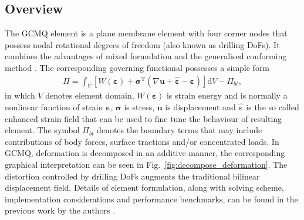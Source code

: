 \documentclass[3p,review,sort&compress,11pt,fleqn]{elsarticle}
\newcommand*{\md}[1]{\mathrm{d}#1}
\newcommand*{\mT}{\mathrm{T}}
\newcommand*{\figref}[1]{Fig.~\ref{#1}}
\newcommand*{\mathbold}{\bm}
\begin{document}
\subsection{Overview}
The GCMQ element is a plane membrane element with four corner nodes that possess nodal rotational degrees of freedom (also known as drilling DoFs). It combines the advantages of mixed formulation and the generalised conforming method \citep{Long2009}. The corresponding governing functional possesses a simple form
\begin{gather}\label{eq:final_principle}
\varPi=\int_V\left[W\left(\mathbold{\varepsilon}\right)+\mathbold{\sigma}^\mT\left(\nabla\mathbold{u}+\hat{\mathbold{\varepsilon}}-\mathbold{\varepsilon}\right)\right]\md{V}-\varPi_{bt},
\end{gather}
in which $V$ denotes element domain, $W\left(\mathbold{\varepsilon}\right)$ is strain energy and is normally a nonlinear function of strain $\mathbold{\varepsilon}$, $\mathbold{\sigma}$ is stress, $\mathbold{u}$ is displacement and $\hat{\mathbold{\varepsilon}}$ is the so called enhanced strain field that can be used to fine tune the behaviour of resulting element. The symbol $\varPi_{bt}$ denotes the boundary terms that may include contributions of body forces, surface tractions and/or concentrated loads. In GCMQ, deformation is decomposed in an additive manner, the corresponding graphical interpretation can be seen in \figref{fig:decompose_deformation}. The distortion controlled by drilling DoFs augments the traditional bilinear displacement field. Details of element formulation, along with solving scheme, implementation considerations and performance benchmarks, can be found in the previous work by the authors \citep{Chang2019}.
\end{document}
